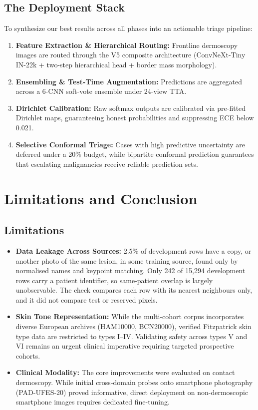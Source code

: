 \documentclass[journal]{IEEEtran}
\begin{document}
\subsection{The Deployment Stack}
To synthesize our best results across all phases into an actionable triage pipeline:
\begin{enumerate}
\item \textbf{Feature Extraction \& Hierarchical Routing:} Frontline dermoscopy images are routed through the V5 composite architecture (ConvNeXt-Tiny IN-22k + two-step hierarchical head + border mass morphology).
\item \textbf{Ensembling \& Test-Time Augmentation:} Predictions are aggregated across a 6-CNN soft-vote ensemble under 24-view TTA.
\item \textbf{Dirichlet Calibration:} Raw softmax outputs are calibrated via pre-fitted Dirichlet maps, guaranteeing honest probabilities and suppressing ECE below 0.021.
\item \textbf{Selective Conformal Triage:} Cases with high predictive uncertainty are deferred under a 20\% budget, while bipartite conformal prediction guarantees that escalating malignancies receive reliable prediction sets.
\end{enumerate}

\section{Limitations and Conclusion}\label{sec:limits}

\subsection{Limitations}
\begin{itemize}
\item \textbf{Data Leakage Across Sources:} 2.5\% of development rows have a copy, or another photo of the same lesion, in some training source, found only by normalised names and keypoint matching. Only 242 of 15,294 development rows carry a patient identifier, so same-patient overlap is largely unobservable. The check compares each row with its nearest neighbours only, and it did not compare test or reserved pixels.
\item \textbf{Skin Tone Representation:} While the multi-cohort corpus incorporates diverse European archives (HAM10000, BCN20000), verified Fitzpatrick skin type data are restricted to types I--IV. Validating safety across types V and VI remains an urgent clinical imperative requiring targeted prospective cohorts.
\item \textbf{Clinical Modality:} The core improvements were evaluated on contact dermoscopy. While initial cross-domain probes onto smartphone photography (PAD-UFES-20) proved informative, direct deployment on non-dermoscopic smartphone images requires dedicated fine-tuning.
\end{itemize}
\end{document}

